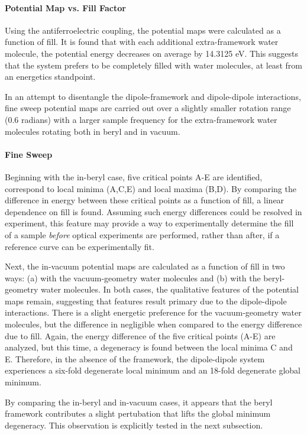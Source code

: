 \paragraph{Potential Map vs. Fill Factor} Using the antiferroelectric coupling, the potential maps were calculated as a function of fill. It is found that with each additional extra-framework water molecule, the potential energy decreases on average by 14.3125 eV. This suggests that the system prefers to be completely filled with water molecules, at least from an energetics standpoint. 

In an attempt to disentangle the dipole-framework and dipole-dipole interactions, fine sweep potential maps are carried out over a slightly smaller rotation range (0.6 radians) with a larger sample frequency for the extra-framework water molecules rotating both in beryl and in vacuum.

\paragraph{Fine Sweep} Beginning with the in-beryl case, five critical points A-E are identified, correspond to local minima (A,C,E) and local maxima (B,D). By comparing the difference in energy between these critical points as a function of fill, a linear dependence on fill is found. Assuming such energy differences could be resolved in experiment, this feature may provide a way to experimentally determine the fill of a sample \textit{before} optical experiments are performed, rather than after, if a reference curve can be experimentally fit. 

Next, the in-vacuum potential maps are calculated as a function of fill in two ways: (a) with the vacuum-geometry water molecules and (b) with the beryl-geometry water molecules. In both cases, the qualitative features of the potential maps remain, suggesting that features result primary due to the dipole-dipole interactions. There is a slight energetic preference for the vacuum-geometry water molecules, but the difference in negligible when compared to the energy difference due to fill. Again, the energy difference of the five critical points (A-E) are analyzed, but this time, a degeneracy is found between the local minima C and E. Therefore, in the absence of the framework, the dipole-dipole system experiences a six-fold degenerate local minimum and an 18-fold degenerate global minimum. 

By comparing the in-beryl and in-vacuum cases, it appears that the beryl framework contributes a slight pertubation that lifts the global minimum degeneracy. This observation is explicitly tested in the next subsection. 

